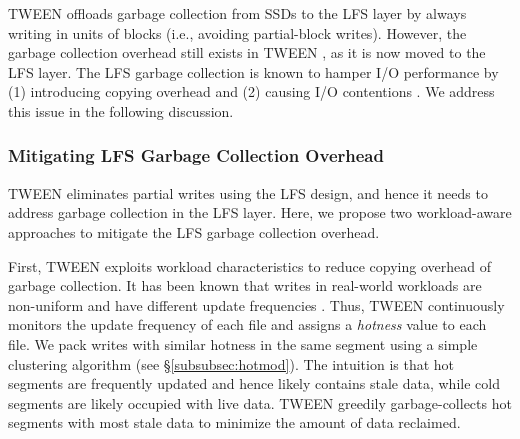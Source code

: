 TWEEN offloads garbage collection from SSDs to the LFS layer by always writing
in units of blocks (i.e., avoiding partial-block writes). However, the garbage
collection overhead still exists in TWEEN
, as it is now moved to the LFS layer.  
The LFS garbage collection is known to hamper I/O performance by (1)
introducing copying overhead \cite{seltzer95} and (2) causing I/O contentions
\cite{shin13}.  We address this issue in the following discussion. 

\subsubsection{Mitigating LFS Garbage Collection Overhead}
\label{subsubsec:mitigating}

TWEEN eliminates partial writes using the LFS design, and hence it needs to
address garbage collection in the LFS layer.  Here, we propose two
workload-aware approaches to mitigate the LFS garbage collection overhead.

First, TWEEN exploits workload characteristics to reduce copying overhead of
garbage collection.  It has been known that writes in real-world workloads are
non-uniform and have different update frequencies \cite{min12,zhang13}. 
Thus, TWEEN continuously monitors the update frequency of each file and
assigns a \textit{hotness} value to each file. We pack writes with similar
hotness in the same segment using a simple clustering algorithm (see
\S\ref{subsubsec:hotmod}).  The intuition is that hot segments are frequently
updated and hence likely contains stale data, while cold segments are likely
occupied with live data.  TWEEN greedily garbage-collects hot segments with
most stale data to minimize the amount of data reclaimed.  




